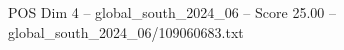 \begin{textsample}{POS Dim 4 – global\_south\_2024\_06 – Score 25.00 – global\_south\_2024\_06/109060683.txt}
\end{textsample}
